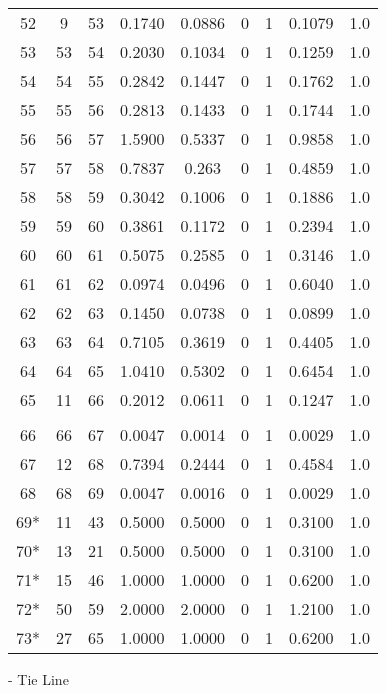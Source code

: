 \begin{longtable}{ccccccccc}
	52 & 9 & 53 & 0.1740 & 0.0886 & 0 & 1 & 0.1079 & 1.0 \\
	53 & 53 & 54 & 0.2030 & 0.1034 & 0 & 1 & 0.1259 & 1.0 \\
	54 & 54 & 55 & 0.2842 & 0.1447 & 0 & 1 & 0.1762 & 1.0 \\
	55 & 55 & 56 & 0.2813 & 0.1433 & 0 & 1 & 0.1744 & 1.0 \\
	56 & 56 & 57 & 1.5900 & 0.5337 & 0 & 1 & 0.9858 & 1.0 \\
	57 & 57 & 58 & 0.7837 & 0.263 & 0 & 1 & 0.4859 & 1.0 \\
	58 & 58 & 59 & 0.3042 & 0.1006 & 0 & 1 & 0.1886 & 1.0 \\
	59 & 59 & 60 & 0.3861 & 0.1172 & 0 & 1 & 0.2394 & 1.0 \\
	60 & 60 & 61 & 0.5075 & 0.2585 & 0 & 1 & 0.3146 & 1.0 \\
	61 & 61 & 62 & 0.0974 & 0.0496 & 0 & 1 & 0.6040 & 1.0 \\
	62 & 62 & 63 & 0.1450 & 0.0738 & 0 & 1 & 0.0899 & 1.0 \\
	63 & 63 & 64 & 0.7105 & 0.3619 & 0 & 1 & 0.4405 & 1.0 \\
	64 & 64 & 65 & 1.0410 & 0.5302 & 0 & 1 & 0.6454 & 1.0 \\
	65 & 11 & 66 & 0.2012 & 0.0611 & 0 & 1 & 0.1247 & 1.0 \\
	\toprule\\
	\hline
	66 & 66 & 67 & 0.0047 & 0.0014 & 0 & 1 & 0.0029 & 1.0 \\
	67 & 12 & 68 & 0.7394 & 0.2444 & 0 & 1 & 0.4584 & 1.0 \\
	68 & 68 & 69 & 0.0047 & 0.0016 & 0 & 1 & 0.0029 & 1.0 \\
	69* & 11 & 43 & 0.5000 & 0.5000 & 0 & 1 & 0.3100 & 1.0 \\
	70* & 13 & 21 & 0.5000 & 0.5000 & 0 & 1 & 0.3100 & 1.0 \\
	71* & 15 & 46 & 1.0000 & 1.0000 & 0 & 1 & 0.6200 & 1.0 \\
	72* & 50 & 59 & 2.0000 & 2.0000 & 0 & 1 & 1.2100 & 1.0 \\
	73* & 27 & 65 & 1.0000& 1.0000 & 0 & 1 & 0.6200 & 1.0 \\
	\bottomrule
\end{longtable}
\newline *- Tie Line	
	

%